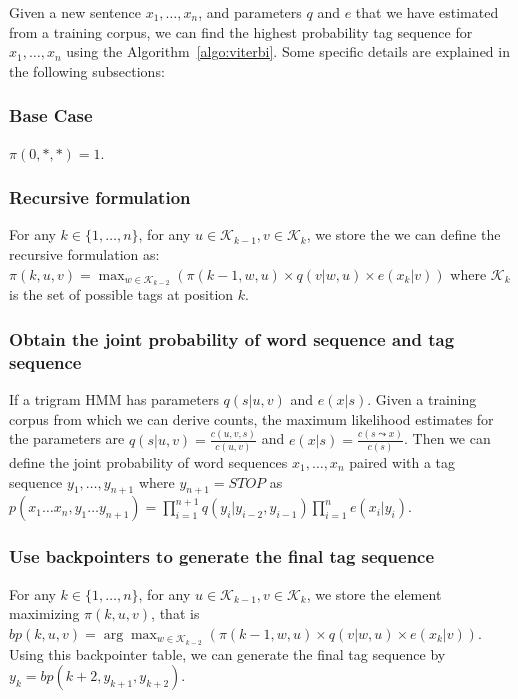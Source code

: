 Given a new sentence $x_1,\dots,x_n$, and parameters $q$ and $e$ that we have estimated from a training corpus, we can find the highest probability tag sequence for $x_1,\dots,x_n$ using the Algorithm~\ref{algo:viterbi}. Some specific details are explained in the following subsections:

\subsubsection{\textbf{Base Case}} $\pi(0, *, *)=1$.

\subsubsection{\textbf{Recursive formulation}} For any $k\in \{1, \dots, n\}$, for any $u\in \mathcal{K}_{k-1}, v\in\mathcal{K}_{k}$, we store the  we can define the recursive formulation as: $\pi(k, u, v)=\max _{w \in \mathcal{K}_{k-2}}\left(\pi(k-1, w, u) \times q(v | w, u) \times e\left(x_{k} | v\right)\right)$ where $\mathcal{K}_{k}$ is the set of possible tags at position $k$.

\subsubsection{\textbf{Obtain the joint probability of word sequence and tag sequence}} If a trigram HMM has parameters $q(s | u, v)$ and $e(x | s)$. Given a training corpus from which we can derive counts, the maximum likelihood estimates for the parameters are $q(s | u, v)=\frac{c(u, v, s)}{c(u, v)}$ and $e(x | s)=\frac{c(s \leadsto x)}{c(s)}$. Then we can define the joint probability of word sequences $x_1, \dots, x_n$ paired with a tag sequence $y_1, \dots, y_{n+1}$ where $y_{n+1}=STOP$ as $p\left(x_{1} \ldots x_{n}, y_{1} \ldots y_{n+1}\right)=\prod_{i=1}^{n+1} q\left(y_{i} | y_{i-2}, y_{i-1}\right) \prod_{i=1}^{n} e\left(x_{i} | y_{i}\right)$.

\subsubsection{\textbf{Use backpointers to generate the final tag sequence}} For any $k\in \{1, \dots, n\}$, for any $u\in \mathcal{K}_{k-1}, v\in\mathcal{K}_{k}$, we store the element maximizing $\pi(k, u, v)$, that is $bp(k, u, v)=\arg \max _{w \in \mathcal{K}_{k-2}}\left(\pi(k-1, w, u) \times q(v | w, u) \times e\left(x_{k} | v\right)\right)$. Using this backpointer table, we can generate the final tag sequence by $y_{k}=bp\left(k+2, y_{k+1}, y_{k+2}\right)$.

